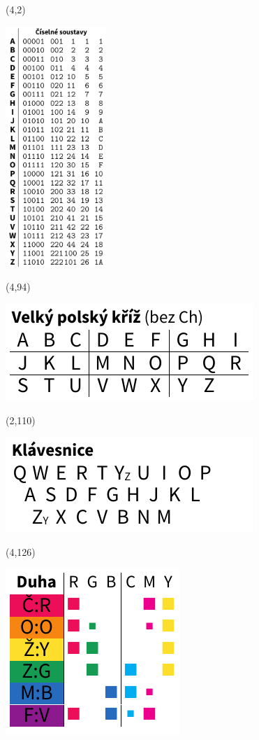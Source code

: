 \documentclass{extarticle}
\begin{document}
\pagecolor{black}
\pagestyle{empty}

\begin{textblock}{38}(4,2)
\vfill
{\centerline{\includegraphics[width=38mm]{tools/numbers-table-v3.pdf}}} 
\vfill
\end{textblock}


\begin{textblock}{38}(4,94)
\vfill
{\centerline{\includegraphics[scale=0.6333]{tools/rosicrucian-polish-v2.pdf}}} 
\vfill
\end{textblock}

\begin{textblock}{38}(2,110)
\vfill
{\centerline{\includegraphics[scale=0.6333]{tools/keyboard-v2.pdf}}} 
\vfill
\end{textblock}

\begin{textblock}{26.6}(4,126)
\vfill
{\centerline{\includegraphics[scale=0.6333]{tools/rainbow-v2.pdf}}} 
\vfill
\end{textblock}
\end{document}
